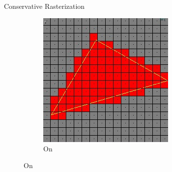 \documentclass[10pt]{beamer}
\begin{document}
\begin{frame}{Conservative Rasterization}
\begin{figure}
\begin{subfigure}[t]{0.4\textwidth}
      \includegraphics[width=\textwidth]{conservativeraster_on}
      \caption*{On}
    \end{subfigure}
  \end{figure}
\end{frame}
\end{document}
